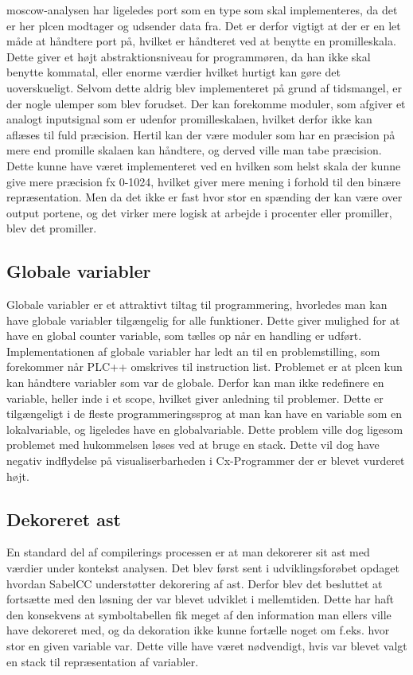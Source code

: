 \noindent \gls{moscow}-analysen har ligeledes port som en type som skal implementeres, da det er her \gls{plc}en modtager og udsender data fra.
Det er derfor vigtigt at der er en let måde at håndtere port på, hvilket er håndteret ved at benytte en promilleskala.
Dette giver et højt abstraktionsniveau for programmøren, da han ikke skal benytte kommatal, eller enorme værdier hvilket hurtigt kan gøre det uoverskueligt.
Selvom dette aldrig blev implementeret på grund af tidsmangel, er der nogle ulemper som blev forudset.
Der kan forekomme moduler, som afgiver et analogt inputsignal som er udenfor promilleskalaen, hvilket derfor ikke kan aflæses til fuld præcision. 
Hertil kan der være moduler som har en præcision på mere end promille skalaen kan håndtere, og derved ville man tabe præcision.
Dette kunne have været implementeret ved en hvilken som helst skala der kunne give mere præcision fx 0-1024, hvilket giver mere mening i forhold til den binære repræsentation. Men da det ikke er fast hvor stor en spænding der kan være over output portene, og det virker mere logisk at arbejde i procenter eller promiller, blev det promiller. 

\subsection*{Globale variabler}
Globale variabler er et attraktivt tiltag til programmering, hvorledes man kan have globale variabler tilgængelig for alle funktioner.
Dette giver mulighed for at have en global counter variable, som tælles op når en handling er udført.
Implementationen af globale variabler har ledt an til en problemstilling, som forekommer når PLC++ omskrives til instruction list. Problemet er at \gls{plc}en kun kan håndtere variabler som var de globale.
Derfor kan man ikke redefinere en variable, heller inde i et scope, hvilket giver anledning til problemer.
Dette er tilgængeligt i de fleste programmeringssprog at man kan have en variable som en lokalvariable, og ligeledes have en globalvariable. Dette problem ville dog ligesom problemet med hukommelsen løses ved at bruge en stack. Dette vil dog have negativ indflydelse på visualiserbarheden i Cx-Programmer der er blevet vurderet højt.

\subsection*{Dekoreret \gls{ast}}
En standard del af compilerings processen er at man dekorerer sit \gls{ast} med værdier under kontekst analysen. Det blev først sent i udviklingsforøbet opdaget hvordan SabelCC understøtter dekorering af \gls{ast}. Derfor blev det besluttet at fortsætte med den løsning der var blevet udviklet i mellemtiden. Dette har haft den konsekvens at symboltabellen fik meget af den information man ellers ville have dekoreret med, og da dekoration ikke kunne fortælle noget om f.eks. hvor stor en given variable var. Dette ville have været nødvendigt, hvis var blevet valgt en stack til repræsentation af variabler.

